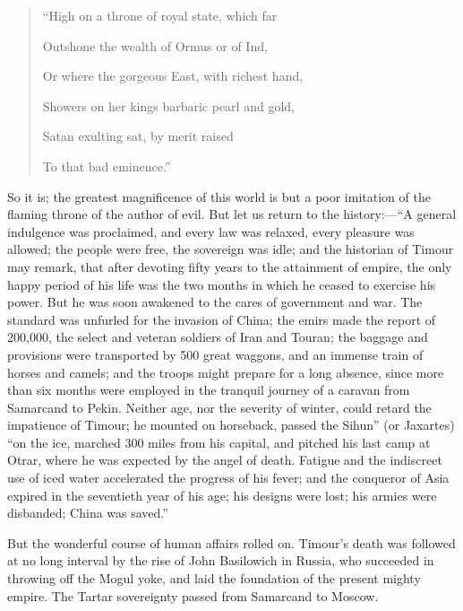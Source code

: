 \begin{quote}

``High on a throne of royal state, which far

Outshone the wealth of Ormus or of Ind,

Or where the gorgeous East, with richest hand,

Showers on her kings barbaric pearl and gold,

Satan exulting sat, by merit raised

To that bad eminence.''

\end{quote}

So it is; the greatest
magnificence of this world is but a poor imitation of the flaming
throne of the author of evil. But let us return to the history:—``A
general indulgence was proclaimed, and every law was relaxed, every
pleasure was allowed; the people were free, the sovereign was idle;
and the historian of Timour may remark, that after devoting fifty
years to the attainment of empire, the only happy period of his life
was the two months in which he ceased to exercise his power. But he
was soon awakened to the cares of government and war. The standard was
unfurled for the invasion of China; the emirs made the report of
200,000, the select and veteran soldiers of Iran and Touran; the
baggage and provisions were transported by 500 great waggons, and an
immense train of horses and camels; and the troops might prepare for a
long absence, since more than six months were employed in the tranquil
journey of a caravan from Samarcand to Pekin. Neither age, nor the
severity of winter, could retard the impatience of Timour; he mounted
on horseback, passed the Sihun'' (or Jaxartes) ``on the ice, marched 300
miles from his capital, and pitched his last camp at Otrar, where he
was expected by the angel of death. Fatigue and the indiscreet use of
iced water accelerated the progress of his fever; and the
conqueror of Asia expired in the seventieth year of his age; his
designs were lost; his armies were disbanded; China was saved.''

But the wonderful course of
human affairs rolled on. Timour's death was followed at no long
interval by the rise of John Basilowich in Russia, who succeeded in
throwing off the Mogul yoke, and laid the foundation of the present
mighty empire. The Tartar sovereignty passed from Samarcand to Moscow.



